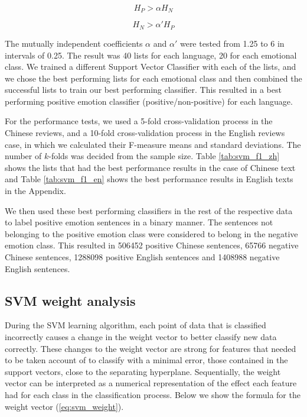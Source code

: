 \documentclass[review]{elsarticle}
\begin{document}
\begin{equation}\label{eq:entropy_pos}
H_{P} > \alpha H_{N} %
\end{equation}

\begin{equation}\label{eq:entropy_neg}
H_{N} > \alpha' H_{P} %
\end{equation}

The mutually independent coefficients \(\alpha\) and \(\alpha'\) were tested from 1.25 to 6 in intervals of 0.25. The result was 40 lists for each language, 20 for each emotional class. We trained a different Support Vector Classifier with each of the lists, and we chose the best performing lists for each emotional class and then combined the successful lists to train our best performing classifier. This resulted in a best performing positive emotion classifier (positive/non-positive) for each language.

For the performance tests, we used a 5-fold cross-validation \cite[][]{kohavi1995} process in the Chinese reviews, and a 10-fold cross-validation process in the English reviews case, in which we calculated their F-measure \cite[][]{powers2011} means and standard deviations. The number of \(k\)-folds was decided from the sample size. Table \ref{tab:svm_f1_zh} shows the lists that had the best performance results in the case of Chinese text and Table \ref{tab:svm_f1_en} shows the best performance results in English texts in the Appendix. 

We then used these best performing classifiers in the rest of the respective data to label positive emotion sentences in a binary manner. The sentences not belonging to the positive emotion class were considered to belong in the negative emotion class. This resulted in \num[group-separator={,}]{506452} positive Chinese sentences, \num[group-separator={,}]{65766} negative Chinese sentences, \num[group-separator={,}]{1288098} positive English sentences and \num[group-separator={,}]{1408988} negative English sentences.

\subsection{SVM weight analysis}\label{svmweightsanalysis}

During the SVM learning algorithm, each point of data that is classified incorrectly causes a change in the weight vector to better classify new data correctly. These changes to the weight vector are strong for features that needed to be taken account of to classify with a minimal error, those contained in the support vectors, close to the separating hyperplane. Sequentially, the weight vector can be interpreted as a numerical representation of the effect each feature had for each class in the classification process. Below we show the formula for the weight vector (\ref{eq:svm_weight}).
\end{document}
